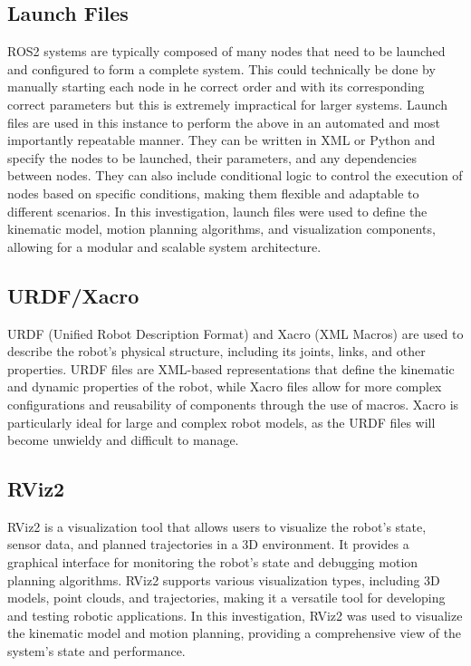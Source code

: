 \documentclass[10pt,a4paper,english]{article}
\begin{document}
\subsection{Launch Files}
ROS2 systems are typically composed of many nodes that need to be launched and configured to form a complete system. This could technically be done by manually starting each node in he correct order and with its corresponding correct parameters but this is extremely impractical for larger systems. Launch files are used in this instance to perform the above in an automated and most importantly repeatable manner. They can be written in XML or Python and specify the nodes to be launched, their parameters, and any dependencies between nodes. They can also include conditional logic to control the execution of nodes based on specific conditions, making them flexible and adaptable to different scenarios. In this investigation, launch files were used to define the kinematic model, motion planning algorithms, and visualization components, allowing for a modular and scalable system architecture.

\subsection{URDF/Xacro}
URDF (Unified Robot Description Format) and Xacro (XML Macros) are used to describe the robot's physical structure, including its joints, links, and other properties. URDF files are XML-based representations that define the kinematic and dynamic properties of the robot, while Xacro files allow for more complex configurations and reusability of components through the use of macros. Xacro is particularly ideal for large and complex robot models, as the URDF files will become unwieldy and difficult to manage.

\subsection{RViz2}
RViz2 is a visualization tool that allows users to visualize the robot's state, sensor data, and planned trajectories in a 3D environment. It provides a graphical interface for monitoring the robot's state and debugging motion planning algorithms. RViz2 supports various visualization types, including 3D models, point clouds, and trajectories, making it a versatile tool for developing and testing robotic applications. In this investigation, RViz2 was used to visualize the kinematic model and motion planning, providing a comprehensive view of the system's state and performance.
\end{document}
